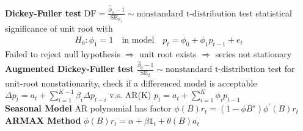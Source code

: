 \documentclass[10pt,landscape, a4paper]{article}
\theoremstyle{remark}
\newcommand{\SE}{\mathrm{SE}}
\begin{document}
\begin{multicols*}{3}
\textbf{Dickey-Fuller test} $\text{DF} = \frac{\hat{\phi}_1 - 1}{\SE_{\phi_1}} \sim \text{nonstandard t-distribution}$ test statistical significance of unit root with
\begin{align*}
    H_0 : \phi_1 = 1 \quad \text{in model} \quad p_t = \phi_0 + \phi_1 p_{t-1} + e_t
\end{align*}
Failed to reject null hypothesis $\Rightarrow$ unit root exists $\Rightarrow$ series not stationary\\
\textbf{Augmented Dickey-Fuller test} $\frac{\hat{\beta}_0 - 1}{\SE_{\beta}} \sim \text{nonstandard t-distribution}$ test for unit-root nonstationarity, check if a differenced model is acceptable $\Delta p_t= a_t + \sum^{K-1}_{i=1} \beta_i \Delta p_{t-i}$ v.s. AR(K) $p_t = a_t + \sum^{K}_{i=1} \phi_i p_{t-1}$\\

\textbf{Seasonal Model} AR polynomial has factor $\phi (B) r_t = (1-\phi B^s) \phi^{\prime} (B) r_t$\\
\textbf{ARMAX Method} $\phi(B) r_t = \alpha + \beta \mathds{1}_t + \theta (B) a_t$\\


\end{multicols*}
\end{document}
